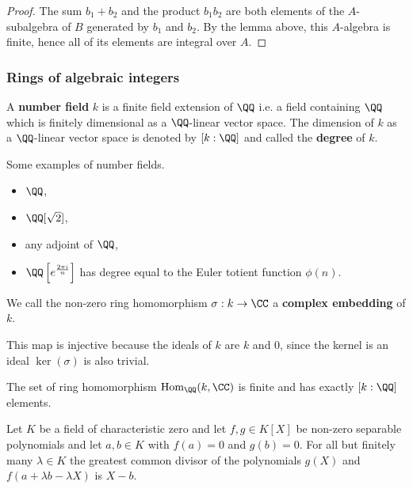 \documentclass[12pt, a4paper]{article}
\begin{document}
\begin{proof}
    The sum \( b_1 + b_2 \) and the product \( b_1b_2 \) are both elements of the \( A \)-subalgebra of \( B \) generated by \( b_1 \) and \( b_2 \). By the lemma above, this \( A \)-algebra is finite, hence all of its elements are integral over \( A \).
\end{proof} 

\subsubsection{Rings of algebraic integers}

\begin{definition}
    A \textbf{number field} \(k\) is a finite field extension of \(\QQ\) i.e. a field containing \(\QQ\) which is finitely dimensional as a \(\QQ\)-linear vector space. The dimension of \(k\) as a \(\QQ\)-linear vector space is denoted by \([k:\QQ]\) and called the \textbf{degree} of \(k\).
\end{definition}

\begin{mdexample}
    Some examples of number fields.
    \begin{itemize}
        \item \(\QQ\),
        \item \(\QQ[\sqrt{2}]\),
        \item any adjoint of \(\QQ\),
        \item \(\QQ\left[ e^{\frac{2\pi i}{n}} \right]\) has degree equal to the Euler totient function \(\phi(n)\).
    \end{itemize}
\end{mdexample}

\begin{definition}
    We call the non-zero ring homomorphism \(\sigma : k\to \CC\) a \textbf{complex embedding} of \(k\). 
\end{definition}

\begin{mdremark}
    This map is injective because the ideals of \(k\) are \(k\) and \(0\), since the kernel is an ideal \(\ker(\sigma)\) is also trivial.
\end{mdremark}

\begin{theorem}
    The set of ring homomorphism \(\text{Hom}_\QQ(k,\CC)\) is finite and has exactly \([k:\QQ]\) elements.
\end{theorem}

\begin{lemma}
    Let \( K \) be a field of characteristic zero and let \( f, g \in K[X] \) be non-zero separable polynomials and let \( a, b \in K \) with \( f(a) = 0 \) and \( g(b) = 0 \). For all but finitely many \( \lambda \in K \) the greatest common divisor of the polynomials \( g(X) \) and \( f(a + \lambda b - \lambda X) \) is \( X - b \).
\end{lemma}
\end{document}

